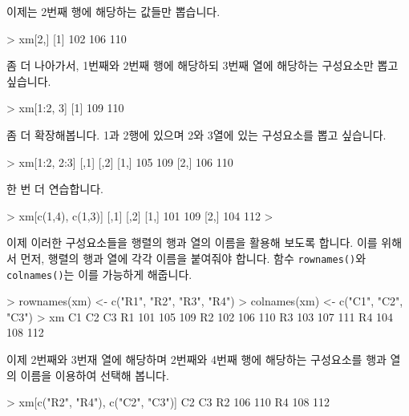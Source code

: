 \documentclass[tutorial.tex]{subfiles}
\begin{document}
이제는 2번째 행에 해당하는 값들만 뽑습니다. 

\begin{Schunk}
\begin{Soutput}
> xm[2,]
[1] 102 106 110
\end{Soutput}
\end{Schunk}

좀 더 나아가서, 1번째와 2번째 행에 해당하되 3번째 열에 해당하는 구성요소만 뽑고 싶습니다. 
\begin{Schunk}
\begin{Soutput}
> xm[1:2, 3]
[1] 109 110
\end{Soutput}
\end{Schunk}

좀 더 확장해봅니다. 1과 2행에 있으며 2와 3열에 있는 구성요소를 뽑고 싶습니다.

\begin{Schunk}
\begin{Soutput}
> xm[1:2, 2:3]
     [,1] [,2]
[1,]  105  109
[2,]  106  110
\end{Soutput}
\end{Schunk}

한 번 더 연습합니다.

\begin{Schunk}
\begin{Soutput}
> xm[c(1,4), c(1,3)]
     [,1] [,2]
[1,]  101  109
[2,]  104  112
> 
\end{Soutput}
\end{Schunk}

이제 이러한 구성요소들을 행렬의 행과 열의 이름을 활용해 보도록 합니다. 
이를 위해서 먼저, 행렬의 행과 열에 각각 이름을 붙여줘야 합니다. 
함수 \texttt{rownames()}와 \texttt{colnames()}는 이를 가능하게 해줍니다.

\begin{Schunk}
\begin{Soutput}
> rownames(xm) <- c("R1", "R2", "R3", "R4")
> colnames(xm) <- c("C1", "C2", "C3")
> xm
    C1  C2  C3
R1 101 105 109
R2 102 106 110
R3 103 107 111
R4 104 108 112
\end{Soutput}
\end{Schunk}

이제 2번째와 3번재 열에 해당하며 2번째와 4번째 행에 해당하는 구성요소를 행과 열의 이름을 이용하여 선택해 봅니다. 

\begin{Schunk}
\begin{Soutput}
> xm[c("R2", "R4"), c("C2", "C3")]
    C2  C3
R2 106 110
R4 108 112
\end{Soutput}
\end{Schunk}
\end{document}
